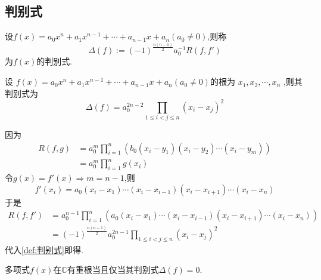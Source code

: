 \subsection{判别式}
\begin{formal}
\begin{definition}[判别式]\label{def:判别式}
    设$f\left(x\right)=a_0x^n
    +a_1x^{n-1}+\cdots+a_{n-1}x+a_n\left(
        a_0\neq 0
    \right)$,则称\[
    \varDelta\left(f\right):=
    \left(-1\right)^{
        \frac{
            n\left(n-1\right)
        }{2}
    }a_0^{-1}R\left(
        f,f'
    \right)
    \]
    为$f\left(x\right)$的判别式.
\end{definition}
\end{formal}
\begin{formal}
\begin{theorem}[判别式的根定义]\label{thm:判别式的根定义}
    设 $f\left(x\right)=a_0x^n
    +a_1x^{n-1}+\cdots+a_{n-1}x+a_n\left(
        a_0\neq 0
    \right)$的根为
    $x_1,x_2,\cdots,x_n$
    ,则其判别式为
    \[
    \varDelta \left(f\right)=
    a_0^{2n-2}\prod_{1\leqslant i<j\leqslant n}\left(
        x_i-x_j
    \right)^2
    \]
\end{theorem}
\begin{Proof}
因为
\begin{align*}
R\left(
    f,g
\right)&=
a_0^m\prod_{i=1}^{n}\left(
    b_0\left(x_i-y_1\right)\left(x_i-y_2\right)\cdots\left(x_i-y_m\right)
\right)\\
&=a_0^m\prod_{i=1}^{n}g\left(x_i\right)
\end{align*}
令$g\left(x\right)=f'\left(x\right)\Longrightarrow m=n-1$,则
\[
f'\left(x_i\right)=a_0\left(x_i-x_1\right)\cdots\left(x_i-x_{i-1}\right)\left(x_i-x_{i+1}\right)\cdots\left(x_i-x_n\right)
\]于是
\begin{align*}
    R\left(f,f'\right)&=a_0^{n-1}\prod_{i=1}^{n}\left(a_0
        \left(x_i-x_1\right)\cdots\left(x_i-x_{i-1}\right)\left(x_i-x_{i+1}\right)\cdots\left(x_i-x_n\right)
    \right)\\
    &=\left(-1\right)^{
    \frac{n\left(n-1\right)}{2}
    }a_0^{2n-1}\prod_{1\leqslant i<j\leqslant n}\left(
        x_i-x_j
    \right)^2
\end{align*}
代入\cref{def:判别式}即得.
\end{Proof}
\end{formal}
\begin{green}
\begin{corollary}[重根判定]\label{cor:重根判定}
    多项式$f\left(x\right)$在$\mathbb{C}$有重根当且仅当其判别式$\varDelta\left(f\right)=0$.
\end{corollary}
\end{green}
